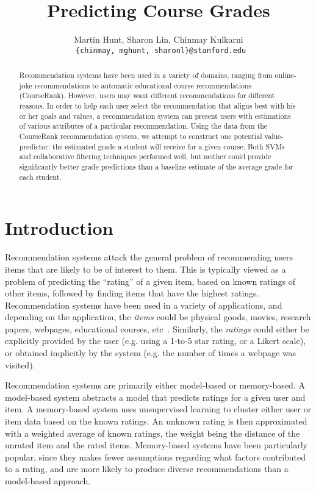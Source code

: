 \documentclass{article} %
\title{Predicting Course Grades}
\author{
Martin Hunt, Sharon Lin, Chinmay Kulkarni \\
\texttt{ \{chinmay, mghunt, sharonl\}@stanford.edu}
}
\begin{document}
\maketitle

\begin{abstract}
Recommendation systems have been used in a variety of domains, ranging from online-joke recommendations to automatic educational course recommendations (CourseRank). However, users may want different recommendations for different reasons.
In order to help each user select the recommendation that aligns best with his or her goals and values, a recommendation system can present users with estimations of various attributes of a particular recommendation.  Using the data from the CourseRank recommendation system, we attempt to construct one potential value-predictor: the estimated grade a student will receive for a given course.  Both SVMs and collaborative filtering techniques performed well, but neither could provide significantly better grade predictions than a baseline estimate of the average grade for each student.
\end{abstract}

\section{Introduction}
\label{sec:intro}
Recommendation systems attack the general problem of recommending users items that are likely to be of interest to them. This is typically viewed as a problem of predicting the ``rating'' of a given item, based on known ratings of other items, followed by finding items that have the highest ratings. Recommendation systems have been used in a variety of applications, and depending on the application, the \textit{items} could be physical goods, movies, research papers, webpages, educational courses, etc~\cite{schafer1999recommender}. Similarly, the \textit{ratings} could either be explicitly provided by the user (e.g. using a 1-to-5 star rating, or a Likert scale), or obtained implicitly by the system (e.g. the number of times a webpage was visited).

Recommendation systems are primarily either model-based or memory-based. A model-based system abstracts a model that predicts ratings for a given user and item. A memory-based system uses unsupervised learning to cluster either user or item data based on the known ratings. An unknown rating is then approximated with a weighted average of known ratings, the weight being the distance of the unrated item and the rated items. Memory-based systems have been particularly popular, since they makes fewer assumptions regarding what factors contributed to a rating, and are more likely to produce diverse recommendations than a model-based approach. 
\end{document}
